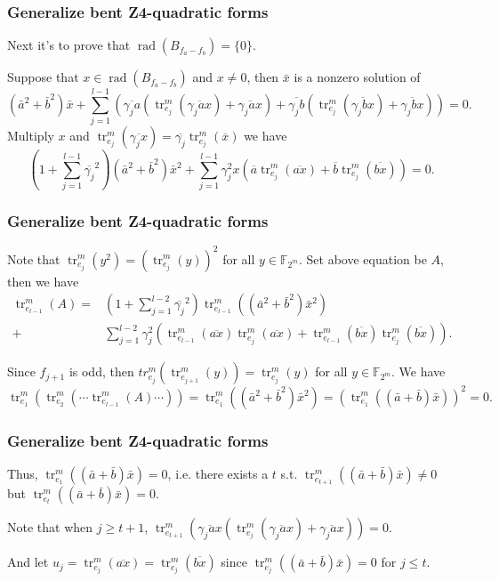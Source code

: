 \documentclass[
    aspectratio=169,                   %
]{beamer}
\newcommand{\F}{\mathbb{F}}
\newcommand{\tr}{\operatorname{tr}}
\begin{document}
    \begin{frame}
        \frametitle{Generalize bent Z4-quadratic forms}
    
        Next it's to prove that $ \operatorname{rad}(B_{f_a-f_b})=\{0\} $.

        Suppose that $ x\in\operatorname{rad}(B_{f_a-f_b}) $ and $ x\neq 0 $, then $ \bar{x} $ is a nonzero solution of 
        \[(\bar{a}^{2}+\bar{b}^{2}) \bar{x}+\sum_{j=1}^{l-1} \left(\overline{\gamma_{j} a}\left(\tr_{e_{j}}^{m}\left(\overline{\gamma_{j}ax}\right)+\overline{\gamma_{j}ax}\right)+\overline{\gamma_{j} b}\left(\tr_{e_{j}}^{m}\left(\overline{\gamma_{j}bx}\right)+\overline{\gamma_{j} b x}\right)\right)=0.\]
        Multiply $ x $ and $ \tr_{e_j}^m(\overline{\gamma_j x})=\overline{\gamma_j}\tr_{e_j}^m(\overline{x}) $ we have 
        \[(1+\sum_{j=1}^{l-1}\overline{\gamma_j}^2)(\bar{a}^{2}+\bar{b}^{2}) \bar{x}^2+\sum_{j=1}^{l-1} \gamma_{j}^2x \left(\overline{a}\tr_{e_{j}}^{m}\left(\overline {ax}\right)+\overline{b}\tr_{e_{j}}^{m}\left(\overline{ bx}\right)\right)=0.\]
    
    \end{frame}
    \begin{frame}
        \frametitle{Generalize bent Z4-quadratic forms}
    
        Note that $ \tr_{e_j}^m(y^2)=(\tr_{e_j}^m(y))^2 $ for all $ y\in\F_{2^m} $. Set above equation be $A$, then we have 
        \begin{align*}
            \tr_{e_{l-1}}^m(A)=&(1+\sum_{j=1}^{l-2}\overline{\gamma_j}^2)\tr_{e_{l-1}}^m((\bar{a}^{2}+\bar{b}^{2}) \bar{x}^2)\\
            +&\sum_{j=1}^{l-2} \gamma_{j}^2 \left(\tr_{e_{l-1}}^m(\overline{ax})\tr_{e_{j}}^{m}\left(\overline {ax}\right)+\tr_{e_{l-1}}^m(\overline{bx})\tr_{e_{j}}^{m}\left(\overline{ bx}\right)\right).
        \end{align*}

        Since $ f_{j+1} $ is odd, then $ tr_{e_j}^m(\tr_{e_{j+1}}^m(y))=\tr_{e_j}^m(y) $ for all $ y\in\F_{2^m} $. We have 
        \[\tr_{e_1}^m\left(\tr_{e_2}^m\left(\cdots\tr_{e_{l-1}}^m(A)\cdots\right)\right)=\tr_{e_{1}}^{m}\left(\left(\bar{a}^{2}+\bar{b}^{2}\right) \bar{x}^{2}\right)=\left(\tr_{e_{1}}^{m}((\bar{a}+\bar{b}) \bar{x})\right)^{2}=0.\]
    
    \end{frame}
    \begin{frame}
        \frametitle{Generalize bent Z4-quadratic forms}
    
        Thus, $ \tr_{e_1}^m((\bar{a}+\bar{b}) \bar{x})=0 $, i.e. there exists a $t$ s.t. $ \tr_{e_{t+1}}^m((\bar{a}+\bar{b}) \bar{x})\neq 0 $ but $ \tr_{e_t}^m((\bar{a}+\bar{b}) \bar{x})=0 $.
    
            Note that when $ j\geq t+1 $, $ \tr_{e_{t+1}}^{m}\left(\overline{\gamma_{j} a x}\left(\tr_{e_{j}}^{m}\left(\overline{\gamma_{j} a x}\right)+\overline{\gamma_{j} a x}\right)\right)=0 $.

            And let $ u_j=\tr_{e_j}^m(\overline{ax})=\tr_{e_j}^m(\overline{bx}) $ since $ \tr_{e_j}^m((\bar{a}+\bar{b}) \bar{x})=0 $ for $ j\leq t $.
    \end{frame}
\end{document}
